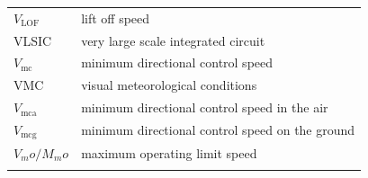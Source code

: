 \documentclass[
]{book}
\begin{document}
\begin{longtable}[]{@{}ll@{}}
\begin{minipage}[t]{0.47\columnwidth}\raggedright
\(V_{\mathrm{LOF}}\)\strut
\end{minipage} & \begin{minipage}[t]{0.47\columnwidth}\raggedright
lift off speed\strut
\end{minipage}\tabularnewline
\begin{minipage}[t]{0.47\columnwidth}\raggedright
VLSIC\strut
\end{minipage} & \begin{minipage}[t]{0.47\columnwidth}\raggedright
very large scale integrated circuit\strut
\end{minipage}\tabularnewline
\begin{minipage}[t]{0.47\columnwidth}\raggedright
\(V_{\mathrm{mc}}\)\strut
\end{minipage} & \begin{minipage}[t]{0.47\columnwidth}\raggedright
minimum directional control speed\strut
\end{minipage}\tabularnewline
\begin{minipage}[t]{0.47\columnwidth}\raggedright
VMC\strut
\end{minipage} & \begin{minipage}[t]{0.47\columnwidth}\raggedright
visual meteorological conditions\strut
\end{minipage}\tabularnewline
\begin{minipage}[t]{0.47\columnwidth}\raggedright
\(V_{\mathrm{mca}}\)\strut
\end{minipage} & \begin{minipage}[t]{0.47\columnwidth}\raggedright
minimum directional control speed in the air\strut
\end{minipage}\tabularnewline
\begin{minipage}[t]{0.47\columnwidth}\raggedright
\(V_{\mathrm{mcg}}\)\strut
\end{minipage} & \begin{minipage}[t]{0.47\columnwidth}\raggedright
minimum directional control speed on the ground\strut
\end{minipage}\tabularnewline
\begin{minipage}[t]{0.47\columnwidth}\raggedright
\(V_mo/M_mo\)\strut
\end{minipage} & \begin{minipage}[t]{0.47\columnwidth}\raggedright
maximum operating limit speed\strut
\end{minipage}\tabularnewline
\begin{minipage}[t]{0.47\columnwidth}\raggedright

\end{minipage}
\end{longtable}
\end{document}

